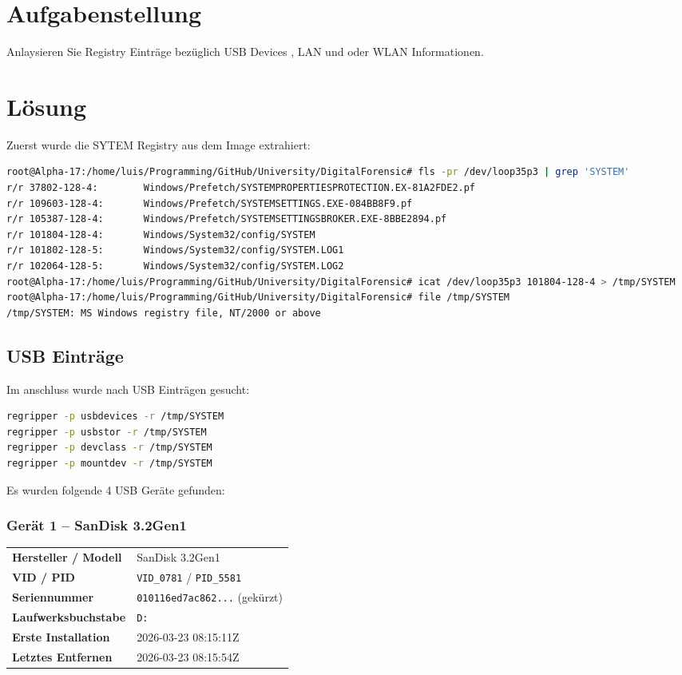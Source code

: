 \section*{Aufgabenstellung}
Anlaysieren Sie Registry Einträge bezüglich USB Devices , LAN und oder WLAN Informationen.

\section*{Lösung}

Zuerst wurde die SYTEM Registry aus dem Image extrahiert:
\begin{lstlisting}[language=bash]
root@Alpha-17:/home/luis/Programming/GitHub/University/DigitalForensic# fls -pr /dev/loop35p3 | grep 'SYSTEM'
r/r 37802-128-4:        Windows/Prefetch/SYSTEMPROPERTIESPROTECTION.EX-81A2FDE2.pf
r/r 109603-128-4:       Windows/Prefetch/SYSTEMSETTINGS.EXE-084BB8F9.pf
r/r 105387-128-4:       Windows/Prefetch/SYSTEMSETTINGSBROKER.EXE-8BBE2894.pf
r/r 101804-128-4:       Windows/System32/config/SYSTEM
r/r 101802-128-5:       Windows/System32/config/SYSTEM.LOG1
r/r 102064-128-5:       Windows/System32/config/SYSTEM.LOG2
root@Alpha-17:/home/luis/Programming/GitHub/University/DigitalForensic# icat /dev/loop35p3 101804-128-4 > /tmp/SYSTEM
root@Alpha-17:/home/luis/Programming/GitHub/University/DigitalForensic# file /tmp/SYSTEM
/tmp/SYSTEM: MS Windows registry file, NT/2000 or above
\end{lstlisting}

\subsection*{USB Einträge}

Im anschluss wurde nach USB Einträgen gesucht:

\begin{lstlisting}[language=bash]
regripper -p usbdevices -r /tmp/SYSTEM
regripper -p usbstor -r /tmp/SYSTEM
regripper -p devclass -r /tmp/SYSTEM
regripper -p mountdev -r /tmp/SYSTEM
\end{lstlisting}

Es wurden folgende 4 USB Geräte gefunden:

\subsubsection*{Gerät 1 – SanDisk 3.2Gen1}

\begin{tabular}{ll}
	\textbf{Hersteller / Modell}   & SanDisk 3.2Gen1 \\
	\textbf{VID / PID}             & \texttt{VID\_0781} / \texttt{PID\_5581} \\
	\textbf{Seriennummer}          & \texttt{010116ed7ac862...} (gekürzt) \\
	\textbf{Laufwerksbuchstabe}    & \texttt{D:} \\
	\textbf{Erste Installation}    & 2026-03-23 08:15:11Z \\
	\textbf{Letztes Entfernen}     & 2026-03-23 08:15:54Z \\
\end{tabular}

